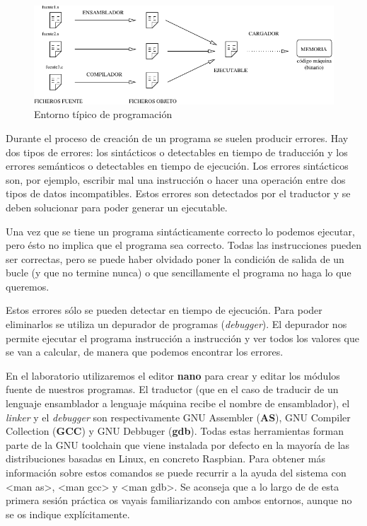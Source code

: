 \begin{figure}[h]
  \centering
    \includegraphics[width=13cm]{graphs/ensamblado.pdf}
  \caption{Entorno típico de programación}
  \label{fig:entorno}
\end{figure}

Durante el proceso de creación de un programa se suelen producir errores.
Hay dos tipos de errores: los sintácticos o detectables en tiempo de
traducción y los errores semánticos o detectables en tiempo de ejecución.
Los errores sintácticos son, por ejemplo, escribir mal una instrucción o
hacer una operación entre dos tipos de datos incompatibles.
Estos errores son detectados por el traductor y se deben solucionar para
poder generar un ejecutable.

Una vez que se tiene un programa sintácticamente correcto lo podemos
ejecutar, pero ésto no implica que el programa sea correcto. Todas las
instrucciones pueden ser correctas, pero se puede haber olvidado poner la
condición de salida de un bucle (y que no termine nunca) o que
sencillamente el programa no haga lo que queremos.

Estos errores sólo se pueden detectar en tiempo de ejecución.
Para poder eliminarlos se utiliza un depurador de programas ({\it debugger}).
El depurador nos permite ejecutar el programa instrucción a instrucción y
ver todos los valores que se van a calcular, de manera que podemos encontrar
los errores.

En el laboratorio utilizaremos el editor {\bf nano} para crear
y editar los módulos fuente de nuestros programas. El traductor
(que en el caso de traducir de un lenguaje ensamblador a lenguaje máquina
recibe el nombre de ensamblador), el {\it linker} y el {\it debugger} son
respectivamente GNU Assembler ({\bf AS}), GNU Compiler Collection ({\bf GCC})
y GNU Debbuger ({\bf gdb}). Todas estas herramientas forman parte de la
GNU toolchain que viene instalada por defecto en la mayoría de las distribuciones
basadas en Linux, en concreto Raspbian. Para obtener más información sobre estos
comandos se puede recurrir a la ayuda del sistema con <man as>, <man gcc> y
<man gdb>. Se aconseja que a lo largo de de esta
primera sesión práctica os vayais familiarizando con ambos entornos,
aunque no se os indique explícitamente.

